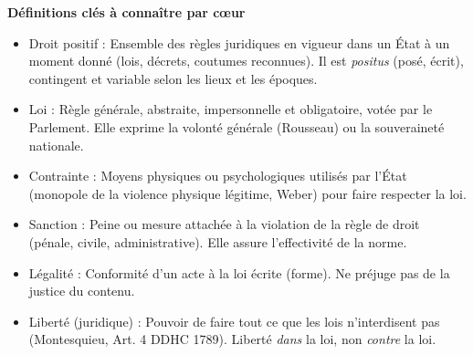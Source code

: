 \documentclass[11pt]{article}
\newcommand{\cle}[1]{{\popxbold\color{popdark}#1}}
\begin{document}
\begin{bilan}
\textbf{Définitions clés à connaître par cœur}
\begin{itemize}
  \item \cle{Droit positif} : Ensemble des règles juridiques en vigueur dans un État à un moment donné (lois, décrets, coutumes reconnues). Il est \emph{positus} (posé, écrit), contingent et variable selon les lieux et les époques.
  \item \cle{Loi} : Règle générale, abstraite, impersonnelle et obligatoire, votée par le Parlement. Elle exprime la volonté générale (Rousseau) ou la souveraineté nationale.
  \item \cle{Contrainte} : Moyens physiques ou psychologiques utilisés par l'État (monopole de la violence physique légitime, Weber) pour faire respecter la loi.
  \item \cle{Sanction} : Peine ou mesure attachée à la violation de la règle de droit (pénale, civile, administrative). Elle assure l'effectivité de la norme.
  \item \cle{Légalité} : Conformité d'un acte à la loi écrite (forme). Ne préjuge pas de la justice du contenu.
  \item \cle{Liberté (juridique)} : Pouvoir de faire tout ce que les lois n'interdisent pas (Montesquieu, Art. 4 DDHC 1789). Liberté \emph{dans} la loi, non \emph{contre} la loi.
\end{itemize}


\end{bilan}
\end{document}
